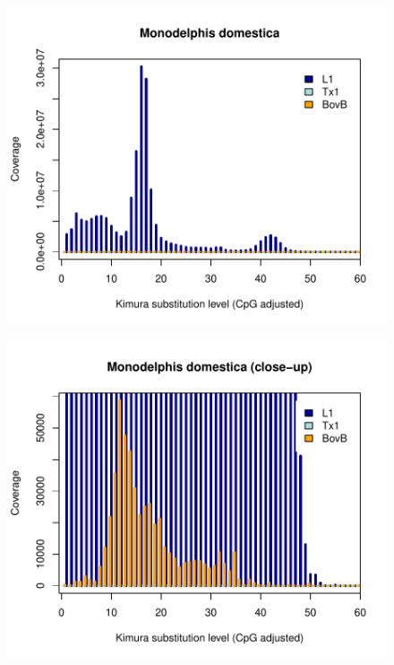 \documentclass[12pt,a4paper,times]{article}
\begin{document}
\begin{figure}[H]
	\centering
	\includegraphics[scale=0.8]{suppFigures/divergencePlots/Monodelphis_domestica.pdf}
	\caption{\label{Monodelphis_domestica}}
\end{figure}

\begin{figure}[H]
	\centering
	\includegraphics[scale=0.8]{suppFigures/divergencePlots/Monodelphis_domestica_closeup.pdf}
	\caption{\label{Monodelphis_domestica_closeup}}
\end{figure}
\end{document}
